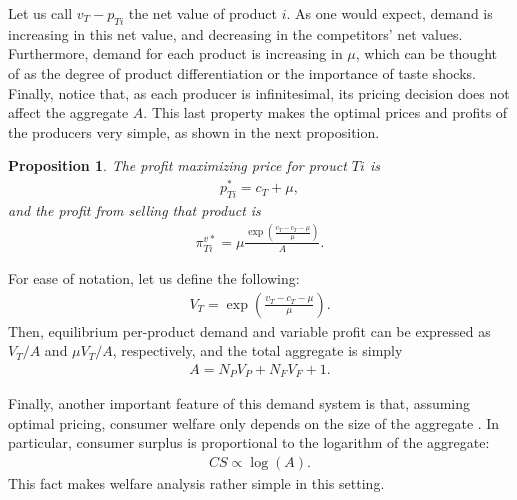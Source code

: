 \documentclass[a4paper]{article}
\newtheorem{proposition}{Proposition}
\begin{document}
Let us call $v_T - p_{Ti}$ the net value of product $i$.
As one would expect, demand is increasing in this net value, and decreasing in the competitors' net values.
Furthermore, demand for each product is increasing in $\mu$, which can be thought of as the degree of product differentiation or the importance of taste shocks.
Finally, notice that, as each producer is infinitesimal, its pricing decision does not affect the aggregate $A$.
This last property makes the optimal prices and profits of the producers very simple, as shown in the next proposition.
\begin{proposition}
    The profit maximizing price for prouct $Ti$ is
    \begin{align*}
        p^*_{Ti} = c_T + \mu,
    \end{align*}
    and the profit from selling that product is
    \begin{align}
        \pi^{v*}_{Ti} = \mu \frac{\exp \left( \frac{v_T - c_T - \mu}{\mu} \right)}{A}.
        \label{eq:optimal_profit}
    \end{align}
\end{proposition}

For ease of notation, let us define the following:
\begin{align*}
    V_T = \exp \left( \frac{v_T - c_T - \mu}{\mu} \right).
\end{align*}
Then, equilibrium per-product demand and variable profit can be expressed as $V_T/ A$ and $\mu V_T/ A$, respectively, and the total aggregate is simply
\begin{align*}
    A = N_P V_P + N_F V_F + 1.
\end{align*}

Finally, another important feature of this demand system is that, assuming optimal pricing, consumer welfare only depends on the size of the aggregate \parencite{anderson2020aggregative}.
In particular, consumer surplus is proportional to the logarithm of the aggregate:
\begin{align*}
    CS \propto \log(A).
\end{align*}
This fact makes welfare analysis rather simple in this setting.
\end{document}
